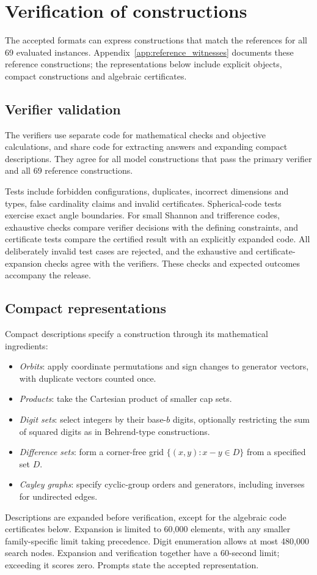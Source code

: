 \appendixpage
\section{Verification of constructions}
\label{app:formats}
The accepted formats can express constructions that match the references for all 69 evaluated instances. Appendix~\ref{app:reference_witnesses} documents these reference constructions; the representations below include explicit objects, compact constructions and algebraic certificates.
\subsection{Verifier validation}
\label{app:verifier_validation}
The verifiers use separate code for mathematical checks and objective calculations, and share code for extracting answers and expanding compact descriptions. They agree for all model constructions that pass the primary verifier and all 69 reference constructions.

Tests include forbidden configurations, duplicates, incorrect dimensions and types, false cardinality claims and invalid certificates. Spherical-code tests exercise exact angle boundaries. For small Shannon and trifference codes, exhaustive checks compare verifier decisions with the defining constraints, and certificate tests compare the certified result with an explicitly expanded code. All deliberately invalid test cases are rejected, and the exhaustive and certificate-expansion checks agree with the verifiers. These checks and expected outcomes accompany the release.

\subsection{Compact representations}
\begin{taskbox}[title=Mathematical ingredients]
Compact descriptions specify a construction through its mathematical ingredients:
\begin{itemize}
\item \emph{Orbits}: apply coordinate permutations and sign changes to generator vectors, with duplicate vectors counted once.
\item \emph{Products}: take the Cartesian product of smaller cap sets.
\item \emph{Digit sets}: select integers by their base-$b$ digits, optionally restricting the sum of squared digits as in Behrend-type constructions.
\item \emph{Difference sets}: form a corner-free grid $\{(x,y):x-y\in D\}$ from a specified set $D$.
\item \emph{Cayley graphs}: specify cyclic-group orders and generators, including inverses for undirected edges.
\end{itemize}
Descriptions are expanded before verification, except for the algebraic code certificates below. Expansion is limited to 60{,}000 elements, with any smaller family-specific limit taking precedence. Digit enumeration allows at most 480{,}000 search nodes. Expansion and verification together have a 60-second limit; exceeding it scores zero. Prompts state the accepted representation.
\end{taskbox}
